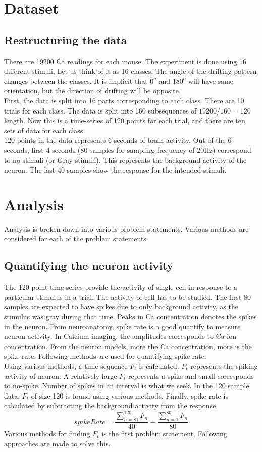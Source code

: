 \documentclass[11pt]{article}
\begin{document}
\section{Dataset} %
\label{sec:dataset}

\subsection{Restructuring the data} %
\label{sub:restructuring_the_data}
There are 19200 Ca readings for each mouse. The experiment is done using 16 different stimuli, Let us think of it as 16 classes. The angle of the drifting pattern changes between the classes. It is implicit that $0^{o}$ and $180^{o}$ will have same orientation, but the direction of drifting will be opposite.\\
First, the data is split into 16 parts corresponding to each class. There are 10 trials for each class. The data is split into 160 subsequences of $19200/160 = 120$ length. Now this is a time-series of 120 points for each trial, and there are ten sets of data for each class.\\
120 points in the data represents 6 seconds of brain activity. Out of the 6 seconds, first 4 seconds (80 samples for sampling frequency of 20Hz) correspond to no-stimuli (or Gray stimuli). This represents the background activity of the neuron. The last 40 samples show the response for the intended stimuli.

\section{Analysis} %
\label{sec:analysis}
Analysis is broken down into various problem statements. Various methods are considered for each of the problem statements.
\subsection{Quantifying the neuron activity} %
\label{sub:quantifying_the_neuron_activity}
The 120 point time series provide the activity of single cell in response to a particular stimulus in a trial. The activity of cell has to be studied. The first 80 samples are expected to have spikes due to only background activity, as the stimulus was gray during that time. Peaks in Ca concentration denotes the spikes in the neuron. From neuroanatomy, spike rate is a good quantify to measure neuron activity. In Calcium imaging, the amplitudes corresponds to Ca ion concentration. From the neuron models, more the Ca concentration, more is the spike rate. Following methods are used for quantifying spike rate.\\
Using various methods, a time sequence $F_t$ is calculated. $F_t$ represents the spiking activity of neuron. A relatively large $F_t$ represents a spike and small corresponds to no-spike. Number of spikes in an interval is what we seek. In the 120 sample data, $F_t$ of size 120 is found using various methods. Finally, spike rate is calculated by subtracting the background activity from the response.
$$spikeRate = \frac{\sum_{n=81}^{120} F_n}{40} - \frac{\sum_{n=1}^{80} F_n}{80}$$
Various methods for finding $F_t$ is the first problem statement. Following approaches are made to solve this.
\end{document}
